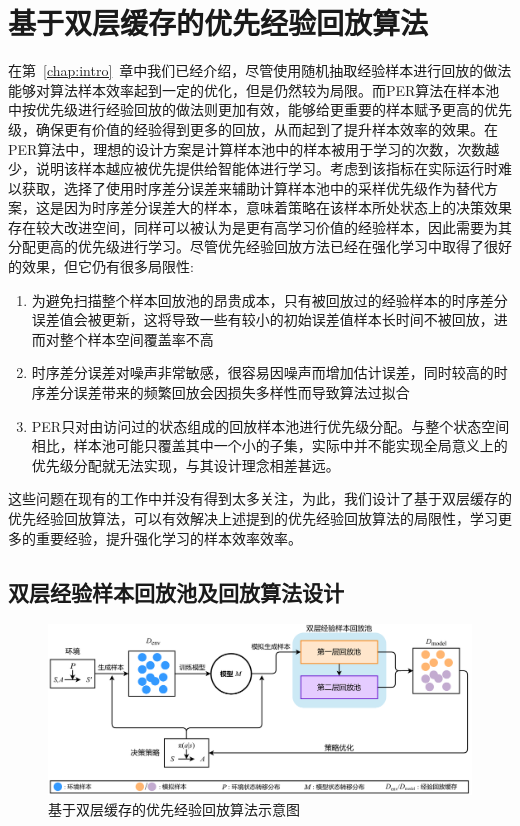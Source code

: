 
\chapter{基于双层缓存的优先经验回放算法}\label{chap:dper}

在第~\ref{chap:intro}~章中我们已经介绍，尽管使用随机抽取经验样本进行回放的做法能够对算法样本效率起到一定的优化，但是仍然较为局限。而PER算法在样本池中按优先级进行经验回放的做法则更加有效，能够给更重要的样本赋予更高的优先级，确保更有价值的经验得到更多的回放，从而起到了提升样本效率的效果。在PER算法中，理想的设计方案是计算样本池中的样本被用于学习的次数，次数越少，说明该样本越应被优先提供给智能体进行学习。考虑到该指标在实际运行时难以获取，选择了使用时序差分误差来辅助计算样本池中的采样优先级作为替代方案，这是因为时序差分误差大的样本，意味着策略在该样本所处状态上的决策效果存在较大改进空间，同样可以被认为是更有高学习价值的经验样本，因此需要为其分配更高的优先级进行学习。尽管优先经验回放方法已经在强化学习中取得了很好的效果，但它仍有很多局限性:

\begin{enumerate}
    \item 为避免扫描整个样本回放池的昂贵成本，只有被回放过的经验样本的时序差分误差值会被更新，这将导致一些有较小的初始误差值样本长时间不被回放，进而对整个样本空间覆盖率不高
    \item 时序差分误差对噪声非常敏感，很容易因噪声而增加估计误差，同时较高的时序差分误差带来的频繁回放会因损失多样性而导致算法过拟合
    \item PER只对由访问过的状态组成的回放样本池进行优先级分配。与整个状态空间相比，样本池可能只覆盖其中一个小的子集，实际中并不能实现全局意义上的优先级分配就无法实现，与其设计理念相差甚远。
\end{enumerate}

这些问题在现有的工作中并没有得到太多关注，为此，我们设计了基于双层缓存的优先经验回放算法，可以有效解决上述提到的优先经验回放算法的局限性，学习更多的重要经验，提升强化学习的样本效率效率。

\section{双层经验样本回放池及回放算法设计}

\begin{figure}[ht]
\centering
\includegraphics[width=\textwidth]{figures/dber.pdf}
\caption{基于双层缓存的优先经验回放算法示意图}
\label{fig:algo-structure}
\end{figure}

